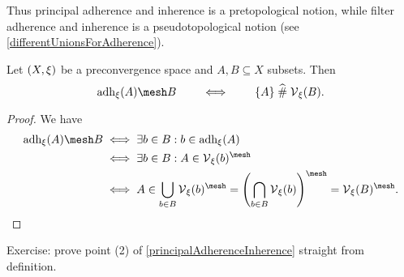 Thus principal adherence and inherence is a pretopological notion, while filter adherence and inherence is a pseudotopological notion (see \ref{differentUnionsForAdherence}).
\begin{corollary} \label{setAdherenceInherence}
Let $\sSet{X,\xi}$ be a preconvergence space and $A,B\subseteq X$ subsets. Then
\[ \adh_\xi(A) \mesh B \qquad\iff\qquad \{A\} \amesh \vicinities_\xi(B). \]
\end{corollary}
\begin{proof}
We have
\begin{align*}
\adh_\xi(A) \mesh B &\iff \exists b\in B: b\in \adh_\xi(A) \\
&\iff \exists b\in B: A\in \vicinities_\xi(b)^{\mesh} \\
&\iff A \in \bigcup_{b\in B}\vicinities_\xi(b)^{\mesh} = \left(\bigcap_{b\in B}\vicinities_\xi(b)\right)^{\mesh} = \vicinities_\xi(B)^{\mesh}.
\end{align*}
\end{proof}

\begin{note}
Exercise: prove point (2) of \ref{principalAdherenceInherence} straight from definition.
\end{note}

